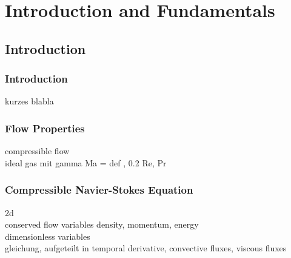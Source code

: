 \section{Introduction and Fundamentals}
\frame{\tableofcontents[currentsection]}
	\subsection{Introduction}
	\begin{frame}
		\frametitle{Introduction}
		kurzes blabla
	\end{frame}
	\begin{frame}
		\frametitle{Flow Properties}
		compressible flow \\
		ideal gas mit gamma
		Ma = def , 0.2
		Re, Pr	
	\end{frame}
	\begin{frame}
		\frametitle{Compressible Navier-Stokes Equation}
		2d\\
		conserved flow variables density, momentum, energy\\
		dimensionless variables\\
		gleichung, aufgeteilt in temporal derivative, convective fluxes, viscous fluxes\\
	\end{frame}
